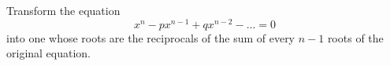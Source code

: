 Transform the equation 
\[
x^n - px^{n-1} + q x^{n-2} - \dots = 0
\]
into one whose roots are the reciprocals
of the sum of every $n-1$ roots of the 
original equation.

